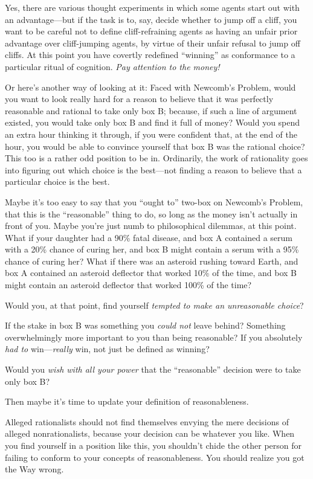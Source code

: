 {
 Yes, there are various thought experiments in which some agents
start out with an advantage---but if the task is to, say, decide
whether to jump off a cliff, you want to be careful not to define
cliff-refraining agents as having an unfair prior advantage over
cliff-jumping agents, by virtue of their unfair refusal to jump off
cliffs. At this point you have covertly redefined
``winning'' as conformance to a
particular ritual of cognition. \textit{Pay attention to the money!}}

{
 Or here's another way of looking at it: Faced with
Newcomb's Problem, would you want to look really hard
for a reason to believe that it was perfectly reasonable and rational
to take only box B; because, if such a line of argument existed, you
would take only box B and find it full of money? Would you spend an
extra hour thinking it through, if you were confident that, at the end
of the hour, you would be able to convince yourself that box B was the
rational choice? This too is a rather odd position to be in.
Ordinarily, the work of rationality goes into figuring out which choice
is the best---not finding a reason to believe that a particular choice
is the best.}

{
 Maybe it's too easy to say that you
``ought to'' two-box on
Newcomb's Problem, that this is the
``reasonable'' thing to do, so long
as the money isn't actually in front of you. Maybe
you're just numb to philosophical dilemmas, at this
point. What if your daughter had a 90\% fatal disease, and box A
contained a serum with a 20\% chance of curing her, and box B might
contain a serum with a 95\% chance of curing her? What if there was an
asteroid rushing toward Earth, and box A contained an asteroid
deflector that worked 10\% of the time, and box B might contain an
asteroid deflector that worked 100\% of the time?}

{
 Would you, at that point, find yourself \textit{tempted to make an
unreasonable choice}?}

{
 If the stake in box B was something you \textit{could not} leave
behind? Something overwhelmingly more important to you than being
reasonable? If you absolutely \textit{had to} win---\textit{really}
win, not just be defined as winning?}

{
 Would you \textit{wish with all your power} that the
``reasonable'' decision were to take
only box B?}

{
 Then maybe it's time to update your definition of
reasonableness.}

{
 Alleged rationalists should not find themselves envying the mere
decisions of alleged nonrationalists, because your decision can be
whatever you like. When you find yourself in a position like this, you
shouldn't chide the other person for failing to conform
to your concepts of reasonableness. You should realize you got the Way
wrong.}

